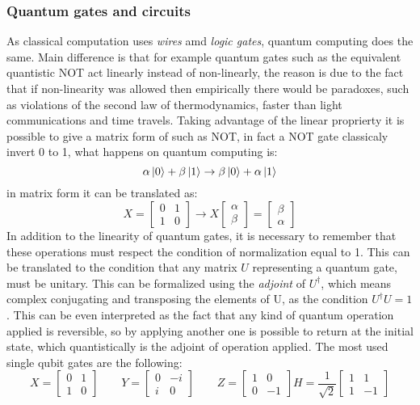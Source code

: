 \subsubsection{Quantum gates and circuits}
As classical computation uses \textit{wires} amd \textit{logic gates}, quantum computing does the same. Main difference is that for example quantum gates such as the equivalent quantistic NOT act linearly instead of non-linearly, the reason is due to the fact that if non-linearity was allowed then empirically there would be paradoxes, such as violations of the second law of thermodynamics, faster than light communications and time travels. Taking advantage of the linear proprierty it is possible to give a matrix form of such as NOT, in fact a NOT gate classicaly invert 0 to 1, what happens on quantum computing is:
\begin{equation*}
	\alpha \ket{0} + \beta \ket{1} \to \beta \ket{0} + \alpha \ket{1}
\end{equation*}
in matrix form it can be translated as:
\begin{equation*}
	X = \begin{bmatrix}
		0 & 1 \\
		1 & 0
	\end{bmatrix}
	\to
	X \begin{bmatrix}
		\alpha \\
		\beta
	\end{bmatrix}
	= \begin{bmatrix}
		\beta \\
		\alpha
	\end{bmatrix}
\end{equation*}
In addition to the linearity of quantum gates, it is necessary to remember that these operations must respect the condition of normalization equal to 1. This can be translated to the condition that any matrix $U$ representing a quantum gate, must be unitary. This can be formalized using the \textit{adjoint} of $U^\dag$, which means complex conjugating and transposing the elements of U, as the condition $U^\dag U = 1$. This can be even interpreted as the fact that any kind of quantum operation applied is reversible, so by applying another one is possible to return at the initial state, which quantistically is the adjoint of operation applied.
The most used single qubit gates are the following:
\begin{equation*}
	X = \begin{bmatrix}
		0 & 1 \\
		1 & 0 
	\end{bmatrix}\qquad
	Y = \begin{bmatrix}
		0 & -i \\
		i & 0
	\end{bmatrix}\qquad
	Z = \begin{bmatrix}
		1 & 0 \\
		0 & -1 
	\end{bmatrix}
	H = \frac{1}{\sqrt{2}}\begin{bmatrix}
		1 & 1 \\
		1 & -1
	\end{bmatrix}
\end{equation*}
